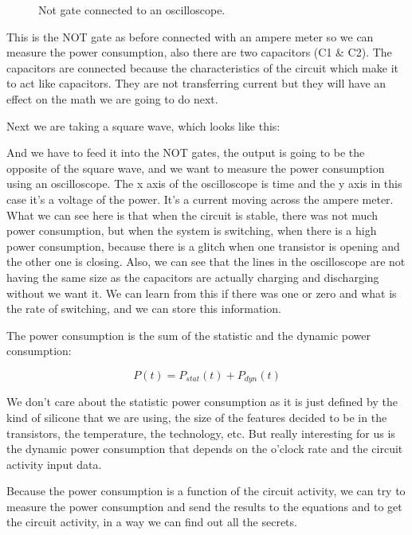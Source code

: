 \begin{figure}[!ht]
    \centering
    
    \caption{Not gate connected to an oscilloscope.} \label{fig:Not gate connected to an oscilloscope}
\end{figure}

This is the NOT gate as before connected with an ampere meter so we can measure the power consumption, also there are two capacitors (C1 \& C2). The capacitors are connected because the characteristics of the circuit which make it to act like capacitors. They are not transferring current but they will have an effect on the math we are going to do next.

Next we are taking a square wave, which looks like this:

And we have to feed it into the NOT gates, the output is going to be the opposite of the square wave, and we want to measure the power consumption using an oscilloscope. The x axis of the oscilloscope is time and the y axis in this case it's a voltage of the power. It's a current moving across the ampere meter. What we can see here is that when the circuit is stable, there was not much power consumption, but when the system is switching, when there is a high power consumption, because there is a glitch when one transistor is opening and the other one is closing. Also, we can see that the lines in the oscilloscope are not having the same size as the capacitors are actually charging and discharging without we want it. We can learn from this if there was one or zero and what is the rate of switching, and we can store this information.

The power consumption is the sum of the statistic and the dynamic power consumption: 

\begin{displaymath}
    P(t)=P_{stat}(t) + P_{dyn}(t)
\end{displaymath}

We don't care about the statistic power consumption as it is just defined by the kind of silicone that we are using, the size of the features decided to be in the transistors, the temperature, the technology, etc. But really interesting for us is the dynamic power consumption that depends on the o'clock rate and the circuit activity input data.

Because the power consumption is a function of the circuit activity, we can try to measure the power consumption and send the results to the equations and to get the circuit activity, in a way we can find out all the secrets.

